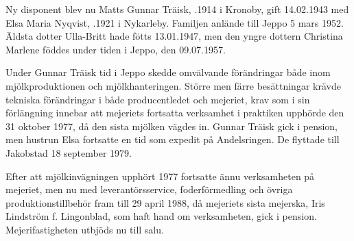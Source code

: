 Ny disponent blev nu Matts Gunnar Träisk, .1914 i Kronoby, gift 14.02.1943 med Elsa Maria Nyqvist, .1921 i Nykarleby. Familjen anlände till Jeppo 5 mars 1952. Äldsta dotter Ulla-Britt hade fötts 13.01.1947, men den yngre dottern Christina Marlene föddes under tiden i Jeppo, den 09.07.1957.

Under Gunnar Träisk tid i Jeppo skedde omvälvande förändringar både inom mjölkproduktionen och mjölkhanteringen. Större men färre besättningar krävde tekniska förändringar i både producentledet och mejeriet, krav som i sin förlängning innebar att mejeriets fortsatta verksamhet i praktiken upphörde den 31 oktober 1977, då den sista mjölken vägdes in. Gunnar Träisk gick i pension, men hustrun Elsa fortsatte en tid som expedit på Andelsringen.  De flyttade till Jakobstad 18 september 1979.


Efter att mjölkinvägningen upphört 1977 fortsatte ännu verksamheten på mejeriet, men nu med leverantörsservice, foderförmedling och övriga produktionstillbehör fram till 29 april 1988, då mejeriets sista mejerska, Iris Lindström f. Lingonblad, som haft hand om verksamheten, gick i pension. Mejerifastigheten utbjöds nu till salu.

